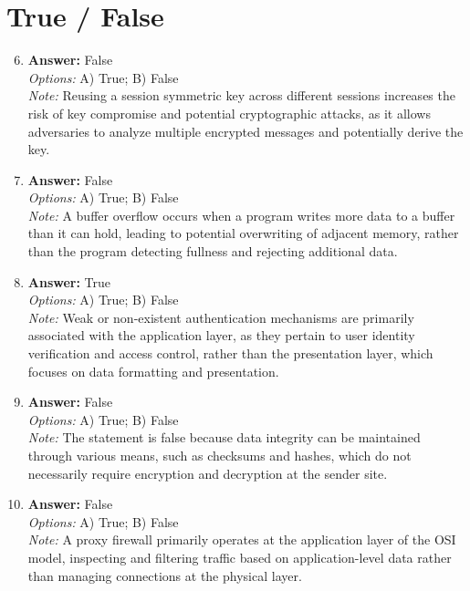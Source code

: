 \documentclass[12pt]{article}
\begin{document}
\section*{True / False}
\begin{enumerate}[label=\arabic*.]
\setcounter{enumi}{5}
\item \textbf{Answer:} False
\\ \textit{Options:} A) True; B) False
\\ \textit{Note:} Reusing a session symmetric key across different sessions increases the risk of key compromise and potential cryptographic attacks, as it allows adversaries to analyze multiple encrypted messages and potentially derive the key.
\item \textbf{Answer:} False
\\ \textit{Options:} A) True; B) False
\\ \textit{Note:} A buffer overflow occurs when a program writes more data to a buffer than it can hold, leading to potential overwriting of adjacent memory, rather than the program detecting fullness and rejecting additional data.
\item \textbf{Answer:} True
\\ \textit{Options:} A) True; B) False
\\ \textit{Note:} Weak or non-existent authentication mechanisms are primarily associated with the application layer, as they pertain to user identity verification and access control, rather than the presentation layer, which focuses on data formatting and presentation.
\item \textbf{Answer:} False
\\ \textit{Options:} A) True; B) False
\\ \textit{Note:} The statement is false because data integrity can be maintained through various means, such as checksums and hashes, which do not necessarily require encryption and decryption at the sender site.
\item \textbf{Answer:} False
\\ \textit{Options:} A) True; B) False
\\ \textit{Note:} A proxy firewall primarily operates at the application layer of the OSI model, inspecting and filtering traffic based on application-level data rather than managing connections at the physical layer.
\end{enumerate}
\end{document}
